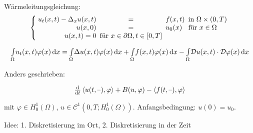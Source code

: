 \documentclass{cheat-sheet}
\newcommand{\Cont}{\mathcal{C}} %
\newcommand{\bOmega}{\partial \Omega} %
\newcommand{\IntOmega}[2]{\AInt{\Omega}{#1}{#2}} %
\newcommand{\Laplace}{\Delta}
\newcommand{\tss}[1]{\textsubscript{#1}} %
\newcommand{\DO}{\mathcal{D}} %
\newcommand{\scp}[2]{\left\langle #1 , #2 \right\rangle} %
\newcommand{\probl}[1]{\textcolor{ProblemColor}{#1}}
\begin{document}



\begin{prob}
  Wärmeleitungsgleichung:
  \[
    \arraycolsep=2.5pt
    \left\{ \begin{array}{rcll}
      u_t(x,t) - \Laplace_x u(x, t) &=& f(x,t) &\text{in $\Omega \times \ointerval{0}{T}$} \\
      u(x,0) &=& u_0(x) & \text{für } x \in \Omega \\
      u(x, t) = 0 & \text{für } x \in \bOmega, t \in \cinterval{0}{T}
    \end{array} \right.
  \]
\end{prob}

\[
  \IntOmega{u_t(x,t) \varphi(x)}{x} = \IntOmega{\Laplace u(x, t) \varphi(x)}{x} + \IntOmega{f(x,t) \varphi(x)}{x} - \IntOmega{\DO u(x, t) \cdot \DO \varphi(x)}{x}
\]

Anders geschrieben:

\[
  \tfrac{\d}{\d t} \scp{u(t, \blank)}{\varphi} + B(u, \varphi) - \scp{f(t, \blank)}{\varphi}
\]

mit $\varphi \in H_0^1(\Omega)$, $u \in \Cont^1(0, T; H_0^1(\Omega))$.
Anfangsbedingung: $u(0) = u_0$.


Idee: 1. Diskretisierung im Ort, 2. Diskretisierung in der Zeit
\end{document}
